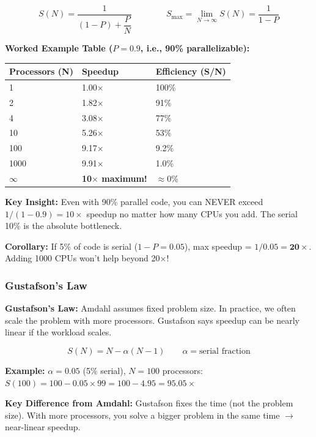 \documentclass[11pt,a4paper]{article}
\begin{document}
\[
\boxed{S(N) = \frac{1}{(1-P) + \dfrac{P}{N}}} \qquad\qquad S_{\max} = \lim_{N\to\infty} S(N) = \frac{1}{1-P}
\]

\textbf{Worked Example Table ($P = 0.9$, i.e., 90\% parallelizable):}

\begin{center}
\begin{tabular}{C{3cm} C{3cm} C{3cm}}
\toprule
\textbf{Processors (N)} & \textbf{Speedup} & \textbf{Efficiency (S/N)} \\
     & 1.00$\times$  & 100\% \\
2     & 1.82$\times$  & 91\% \\
4     & 3.08$\times$  & 77\% \\
10    & 5.26$\times$  & 53\% \\
100   & 9.17$\times$  & 9.2\% \\
1000  & 9.91$\times$  & 1.0\% \\
$\infty$ & \textbf{10$\times$ maximum!} & $\approx$0\% \\
\bottomrule
\end{tabular}
\end{center}

\textbf{Key Insight:} Even with 90\% parallel code, you can NEVER exceed $1/(1-0.9) = 10\times$ speedup no matter how many CPUs you add. The serial 10\% is the absolute bottleneck.

\textbf{Corollary:} If 5\% of code is serial ($1-P = 0.05$), max speedup = $1/0.05 = \mathbf{20}\times$. Adding 1000 CPUs won't help beyond 20$\times$!

\subsubsection{Gustafson's Law}

\begin{mydef}
\textbf{Gustafson's Law:} Amdahl assumes fixed problem size. In practice, we often scale the problem with more processors. Gustafson says speedup can be nearly linear if the workload scales.
\end{mydef}

\[
\boxed{S(N) = N - \alpha(N-1)} \qquad \alpha = \text{serial fraction}
\]

\textbf{Example:} $\alpha = 0.05$ (5\% serial), $N = 100$ processors:\\
$S(100) = 100 - 0.05 \times 99 = 100 - 4.95 = \mathbf{95.05}\times$

\textbf{Key Difference from Amdahl:} Gustafson fixes the time (not the problem size). With more processors, you solve a bigger problem in the same time $\to$ near-linear speedup.
\end{document}
